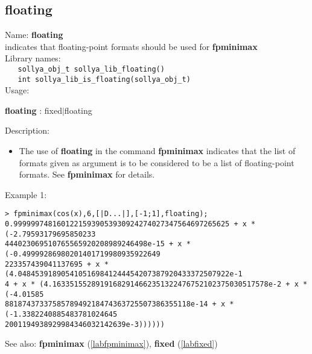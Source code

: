 \subsection{floating}
\label{labfloating}
\noindent Name: \textbf{floating}\\
\phantom{aaa}indicates that floating-point formats should be used for \textbf{fpminimax}\\[0.2cm]
\noindent Library names:\\
\verb|   sollya_obj_t sollya_lib_floating()|\\
\verb|   int sollya_lib_is_floating(sollya_obj_t)|\\[0.2cm]
\noindent Usage: 
\begin{center}
\textbf{floating} : \textsf{fixed$|$floating}\\
\end{center}
\noindent Description: \begin{itemize}

\item The use of \textbf{floating} in the command \textbf{fpminimax} indicates that the list of
   formats given as argument is to be considered to be a list of floating-point
   formats.
   See \textbf{fpminimax} for details.
\end{itemize}
\noindent Example 1: 
\begin{center}\begin{minipage}{15cm}\begin{Verbatim}[frame=single]
> fpminimax(cos(x),6,[|D...|],[-1;1],floating);
0.99999974816012215939053930924274027347564697265625 + x * (-2.79593179695850233
444023069510765565920208989246498e-15 + x * (-0.49999286980201401719980935922649
223357439041137695 + x * (4.0484539189054105169841244454207387920433372507922e-1
4 + x * (4.16335155289191682914662351322476752102375030517578e-2 + x * (-4.01585
8818743733758578949218474363725507386355118e-14 + x * (-1.3382240885483781024645
2001194938929984346032142639e-3))))))
\end{Verbatim}
\end{minipage}\end{center}
See also: \textbf{fpminimax} (\ref{labfpminimax}), \textbf{fixed} (\ref{labfixed})
